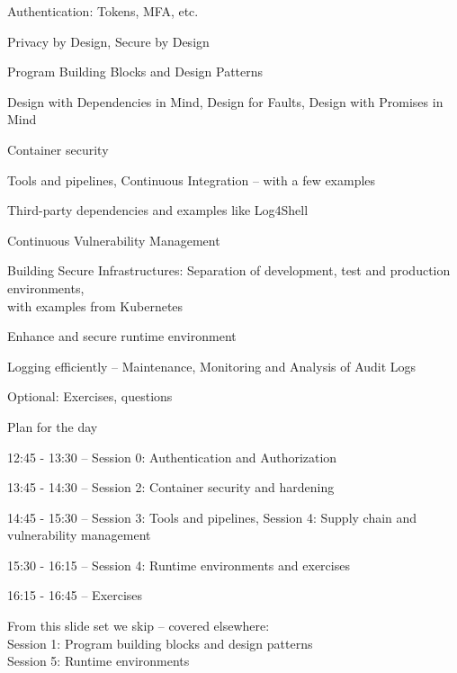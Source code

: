\documentclass[Screen16to9,17pt]{foils}
\begin{document}
\begin{list2}
\item Authentication: Tokens, MFA, etc.
\item Privacy by Design, Secure by Design
\item Program Building Blocks and Design Patterns
\item Design with Dependencies in Mind, Design for Faults, Design with Promises in Mind
\item Container security
\item Tools and pipelines, Continuous Integration -- with a few examples
\item Third-party dependencies and examples like Log4Shell
\item Continuous Vulnerability Management
\item Building Secure Infrastructures: Separation of development, test and production environments,\\ with examples from Kubernetes
\item Enhance and secure runtime environment
\item Logging efficiently -- Maintenance, Monitoring and Analysis of Audit Logs
\item Optional: Exercises, questions
\end{list2}



Plan for the day
\begin{list1}

\item 12:45 - 13:30 -- Session 0: Authentication and Authorization
\item 13:45 - 14:30 -- Session 2: Container security and hardening
\item 14:45 - 15:30 -- Session 3: Tools and pipelines, Session 4: Supply chain and vulnerability management
\item 15:30 - 16:15 -- Session 4: Runtime environments and exercises
\item 16:15 - 16:45 -- Exercises
\end{list1}

From this slide set we skip -- covered elsewhere:\\
Session 1: Program building blocks and design patterns\\
Session 5: Runtime environments


\end{document}
